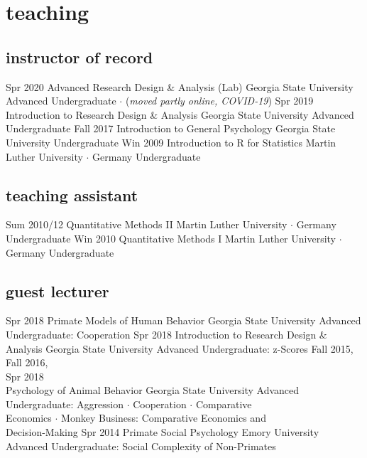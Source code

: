 \documentclass[]{friggeri-cv}
\begin{document}

\section{teaching}

\subsection{instructor of record}

\begin{entrylist}
  \entry
    {Spr 2020}
    {Advanced Research Design \& Analysis (Lab)}
    {Georgia State University}
    {Advanced Undergraduate $\cdot$ (\emph{moved partly online, COVID-19})}
  \entry
    {Spr 2019}
    {Introduction to Research Design \& Analysis}
    {Georgia State University}
    {Advanced Undergraduate}
  \entry
    {Fall 2017}
    {Introduction to General Psychology}
    {Georgia State University}
    {Undergraduate}
  \entry
    {Win 2009}
    {Introduction to R for Statistics}
    {Martin Luther University $\cdot$ Germany}
    {Undergraduate}
\end{entrylist}

\subsection{teaching assistant}

\begin{entrylist}
  \entry
    {Sum 2010/12}
    {Quantitative Methods II}
    {Martin Luther University $\cdot$ Germany}
    {Undergraduate}
  \entry
    {Win 2010}
    {Quantitative Methods I}
    {Martin Luther University $\cdot$ Germany}
    {Undergraduate}
\end{entrylist}

\subsection{guest lecturer}

\begin{entrylist}
  \entry
    {Spr 2018}
    {Primate Models of Human Behavior}
    {Georgia State University}
    {Advanced Undergraduate: Cooperation}
  \entry
    {Spr 2018}
    {Introduction to Research Design \& Analysis}
    {Georgia State University}
    {Advanced Undergraduate: z-Scores}
  \entry
    {Fall 2015,\\Fall 2016,\\Spr 2018\\[-1.3cm]}
    {Psychology of Animal Behavior}
    {Georgia State University}
    {Advanced Undergraduate: Aggression $\cdot$ Cooperation $\cdot$ Comparative \\
    Economics $\cdot$ Monkey Business: Comparative Economics and \\
    Decision-Making}
  \entry
    {Spr 2014}
    {Primate Social Psychology}
    {Emory University}
    {Advanced Undergraduate: Social Complexity of Non-Primates}
\end{entrylist}
\end{document}
